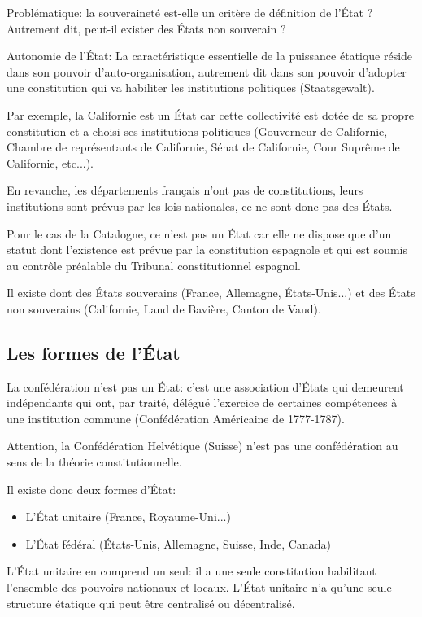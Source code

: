 \documentclass[12pt, a4paper, openany]{book}
\begin{document}
Problématique: la souveraineté est-elle un critère de définition de l'État ? Autrement dit, peut-il exister des États non souverain ?

Autonomie de l'État: La caractéristique essentielle de la puissance étatique réside dans son pouvoir d'auto-organisation, autrement dit dans son pouvoir d'adopter une constitution qui va habiliter les institutions politiques (Staatsgewalt).

Par exemple, la Californie est un État car cette collectivité est dotée de sa propre constitution et a choisi ses institutions politiques (Gouverneur de Californie, Chambre de représentants de Californie, Sénat de Californie, Cour Suprême de Californie, etc...).

En revanche, les départements français n'ont pas de constitutions, leurs institutions sont prévus par les lois nationales, ce ne sont donc pas des États.

Pour le cas de la Catalogne, ce n'est pas un État car elle ne dispose que d'un statut dont l'existence est prévue par la constitution espagnole et qui est soumis au contrôle préalable du Tribunal constitutionnel espagnol.

Il existe dont des États souverains (France, Allemagne, États-Unis...) et des États non souverains (Californie, Land de Bavière, Canton de Vaud).

		\subsection{Les formes de l'État}

La confédération n'est pas un État: c'est une association d'États qui demeurent indépendants qui ont, par traité, délégué l'exercice de certaines compétences à une institution commune (Confédération Américaine de 1777-1787).

Attention, la Confédération Helvétique (Suisse) n'est pas une confédération au sens de la théorie constitutionnelle.


Il existe donc deux formes d'État:
\begin{itemize}
\item L'État unitaire (France, Royaume-Uni...)
\item L'État fédéral (États-Unis, Allemagne, Suisse, Inde, Canada)
\end{itemize}

L'État unitaire en comprend un seul: il a une seule constitution habilitant l'ensemble des pouvoirs nationaux et locaux. L'État unitaire n'a qu'une seule structure étatique qui peut être centralisé ou décentralisé.
\end{document}
